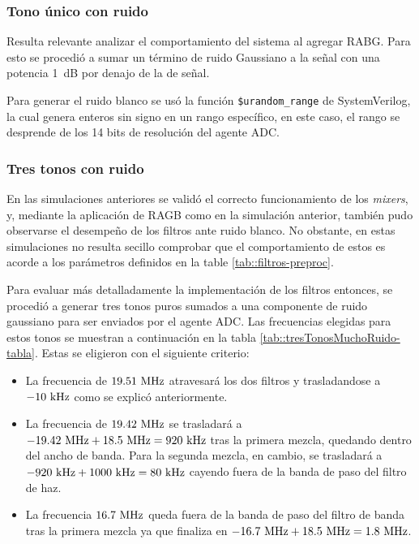 \documentclass[../../main.tex]{subfiles}
\begin{document}
\subsubsection{Tono único con ruido}
Resulta relevante analizar el comportamiento del sistema al agregar RABG. Para esto se procedió a sumar un término de ruido Gaussiano a la señal con una potencia 1~dB por denajo de la de señal.

Para generar el ruido blanco se usó la función \texttt{\$urandom\_range} de SystemVerilog, la cual genera enteros sin signo en un rango específico, en este caso, el rango se desprende de los 14 bits de resolución del agente ADC.


\subsubsection{Tres tonos con ruido}
En las simulaciones anteriores se validó el correcto funcionamiento de los \textit{mixers}, y, mediante la aplicación de RAGB como en la simulación anterior, también pudo observarse el desempeño de los filtros ante ruido blanco. No obstante, en estas simulaciones no resulta secillo comprobar que el comportamiento de estos es acorde a los parámetros definidos en la table \ref{tab::filtros-preproc}.

Para evaluar más detalladamente la implementación de los filtros entonces, se procedió a generar tres tonos puros sumados a una componente de ruido gaussiano para ser enviados por el agente ADC. Las frecuencias elegidas para estos tonos se muestran a continuación en la tabla \ref{tab::tresTonosMuchoRuido-tabla}. Estas se eligieron con el siguiente criterio:
\begin{itemize}
    \item La frecuencia de $19.51~\textrm{MHz}$ atravesará los dos filtros y trasladandose a $-10~\textrm{kHz}$ como se explicó anteriormente.
    \item La frecuencia de $19.42~\textrm{MHz}$ se trasladará a $-19.42~\textrm{MHz} + 18.5~\textrm{MHz} = 920~\textrm{kHz}$ tras la primera mezcla, quedando dentro del ancho de banda. Para la segunda mezcla, en cambio, se trasladará a $-920~\textrm{kHz} + 1000~\textrm{kHz} = 80~\textrm{kHz}$ cayendo fuera de la banda de paso del filtro de haz.
    \item La frecuencia $16.7~\textrm{MHz}$ queda fuera de la banda de paso del filtro de banda tras la primera mezcla ya que finaliza en $-16.7~\textrm{MHz} + 18.5~\textrm{MHz} = 1.8~\textrm{MHz}$. 
\end{itemize}
\end{document}
